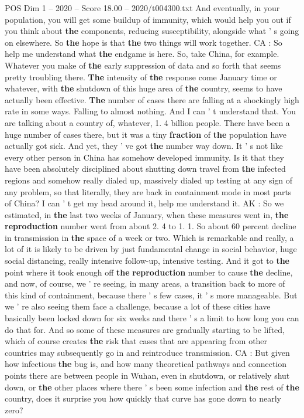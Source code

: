 \begin{textsample}{POS Dim 1 – 2020 – Score 18.00 – 2020/t004300.txt}
And eventually, in your population, you will get some buildup of immunity, which would help you out if you think about \textbf{the} components, reducing susceptibility, alongside what ' s going on elsewhere.
So \textbf{the} hope is that \textbf{the} two things will work together.
CA : So help me understand what \textbf{the} endgame is here.
So, take China, for example.
Whatever you make of \textbf{the} early suppression of data and so forth that seems pretty troubling there. \textbf{The} intensity of \textbf{the} response come January time or whatever, with \textbf{the} shutdown of this huge area of \textbf{the} country, seems to have actually been effective. \textbf{The} number of cases there are falling at a shockingly high rate in some ways.
Falling to almost nothing.
And I can ' t understand that.
You are talking about a country of, whatever, 1. 4 billion people.
There have been a huge number of cases there, but it was a tiny \textbf{fraction} of \textbf{the} population have actually got sick.
And yet, they ' ve got \textbf{the} number way down.
It ' s not like every other person in China has somehow developed immunity.
Is it that they have been absolutely disciplined about shutting down travel from \textbf{the} infected regions and somehow really dialed up, massively dialed up testing at any sign of any problem, so that literally, they are back in containment mode in most parts of China?
I can ' t get my head around it, help me understand it.
AK : So we estimated, in \textbf{the} last two weeks of January, when these measures went in, \textbf{the} \textbf{reproduction} number went from about 2. 4 to 1. 1.
So about 60 percent decline in transmission in \textbf{the} space of a week or two.
Which is remarkable and really, a lot of it is likely to be driven by just fundamental change in social behavior, huge social distancing, really intensive follow-up, intensive testing.
And it got to \textbf{the} point where it took enough off \textbf{the} \textbf{reproduction} number to cause \textbf{the} decline, and now, of course, we ' re seeing, in many areas, a transition back to more of this kind of containment, because there ' s few cases, it ' s more manageable.
But we ' re also seeing them face a challenge, because a lot of these cities have basically been locked down for six weeks and there ' s a limit to how long you can do that for.
And so some of these measures are gradually starting to be lifted, which of course creates \textbf{the} risk that cases that are appearing from other countries may subsequently go in and reintroduce transmission.
CA : But given how infectious \textbf{the} bug is, and how many theoretical pathways and connection points there are between people in Wuhan, even in shutdown, or relatively shut down, or \textbf{the} other places where there ' s been some infection and \textbf{the} rest of \textbf{the} country, does it surprise you how quickly that curve has gone down to nearly zero?

\end{textsample}

